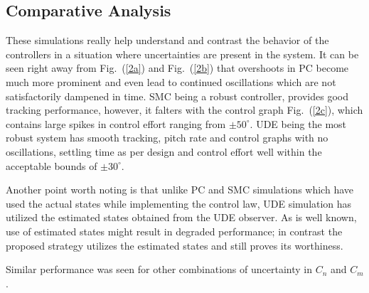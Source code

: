 \documentclass[conference]{IEEEtran}
\begin{document}
		\subsection{Comparative Analysis} 
		
		These simulations really help understand and contrast the behavior of the controllers in a situation where uncertainties are present in the system. It can be seen right away from Fig.~(\ref{2a}) and Fig.~(\ref{2b}) that overshoots in PC become much more prominent and even lead to continued oscillations which are not satisfactorily dampened in time. SMC being a robust controller, provides good tracking performance, however, it falters with the control graph Fig.~(\ref{2c}), which contains large spikes in control effort ranging from $\pm 50^\circ$. UDE being the most robust system has smooth tracking, pitch rate and control graphs with no oscillations, settling time as per design and control effort well within the acceptable bounds of $\pm30^\circ$. 
		
		Another point worth noting is that unlike PC and SMC simulations which have used the actual states while implementing the control law, UDE simulation has utilized the estimated states obtained from the UDE observer. As is well known, use of estimated states might result in degraded performance; in contrast the proposed strategy utilizes the estimated states and still proves its worthiness. 
		
		Similar performance was seen for other combinations of uncertainty in $C_n$ and $C_m$.	
				
	
\end{document}
